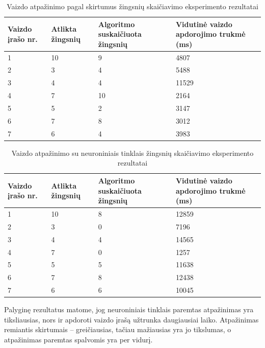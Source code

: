 \documentclass{VUMIFPSbakalaurinis}
\begin{document}
\begin{table}[H]\footnotesize
	\centering
	\caption{Vaizdo atpažinimo pagal skirtumus žingsnių skaičiavimo eksperimento rezultatai}
	{\begin{tabular}{|p{3cm}|p{3cm}|p{3cm}|p{3cm}|} \hline
			\textbf{Vaizdo įrašo nr.} & \textbf{Atlikta žingsnių} & \textbf{Algoritmo suskaičiuota žingsnių} & \textbf{Vidutinė vaizdo apdorojimo trukmė (ms)} \\
			\hline
			1  & 10    & 9    & 4807    \\
			\hline
			2  & 3    & 4  & 5488     \\
			\hline
			3  & 4    & 4   & 11529    \\
			\hline
			4  & 7    & 10  & 2164     \\
			\hline
			5  & 5    & 2  & 3147     \\
			\hline
			6  & 7    & 8  & 3012     \\
			\hline
			7  & 6    & 4  & 3983     \\
			\hline
	\end{tabular}}
	\label{tab:diffresults}
\end{table}

\begin{table}[H]\footnotesize
	\centering
	\caption{Vaizdo atpažinimo su neuroniniais tinklais žingsnių skaičiavimo eksperimento rezultatai}
	{\begin{tabular}{|p{3cm}|p{3cm}|p{3cm}|p{3cm}|} \hline
			\textbf{Vaizdo įrašo nr.} & \textbf{Atlikta žingsnių} & \textbf{Algoritmo suskaičiuota žingsnių} & \textbf{Vidutinė vaizdo apdorojimo trukmė (ms)} \\
			\hline
			1  & 10    & 8    & 12859    \\
			\hline
			2  & 3    & 0  & 7196     \\
			\hline
			3  & 4    & 4   & 14565    \\
			\hline
			4  & 7    & 0  & 1257     \\
			\hline
			5  & 5    & 5  & 11638     \\
			\hline
			6  & 7    & 8  & 12438     \\
			\hline
			7  & 6    & 6  & 10045     \\
			\hline
	\end{tabular}}
	\label{tab:poseresults}
\end{table}

Palyginę rezultatus matome, jog neuroniniais tinklais paremtas atpažinimas yra tiksliausias, nors ir apdoroti vaizdo įrašą užtrunka daugiausiai laiko. Atpažinimas remiantis skirtumais – greičiausias, tačiau mažiausias yra jo tikslumas, o atpažinimas paremtas spalvomis yra per vidurį. 
\end{document}
